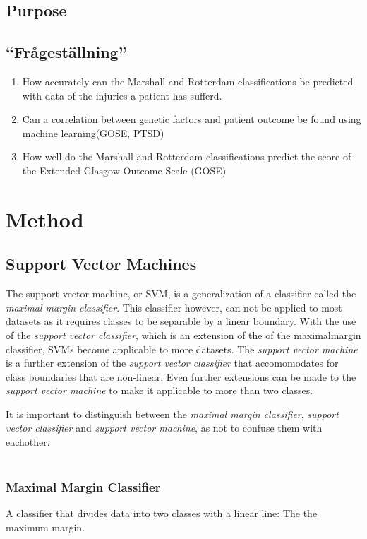 \documentclass[11pt]{article}
\begin{document}
\subsection{Purpose}

\subsection{``Frågeställning''}

\begin{enumerate}
  \item{How accurately can the Marshall and Rotterdam classifications be predicted with data of the injuries a patient has sufferd.}
  \item{Can a correlation between genetic factors and patient outcome be found using machine learning(GOSE, PTSD)}
  \item{How well do the Marshall and Rotterdam classifications predict the score of the Extended Glasgow Outcome Scale (GOSE)}
\end{enumerate}

\section{Method}
\subsection{Support Vector Machines}
The support vector machine, or SVM, is a generalization of a classifier called the \textit{maximal margin classifier}. This classifier however, can not be applied to most datasets as it requires classes to be separable by a linear boundary. With the use of the \textit{support vector classifier}, which is an extension of the of the maximalmargin classifier, SVMs become applicable to more datasets. The \textit{support vector machine} is a further extension of the \textit{support vector classifier} that accomomodates for class boundaries that are non-linear. Even further extensions can be made to the \textit{support vector machine} to make it applicable to more than two classes.\cite{jamesSupportVectorMachines}

It is important to distinguish between the \textit{maximal margin classifier}, \textit{support vector classifier} and \textit{support vector machine}, as not to confuse them with eachother.\cite{jamesSupportVectorMachines}\\
\\
\subsubsection{Maximal Margin Classifier}
A classifier that divides data into two classes with a linear line: The the maximum margin.
\end{document}
